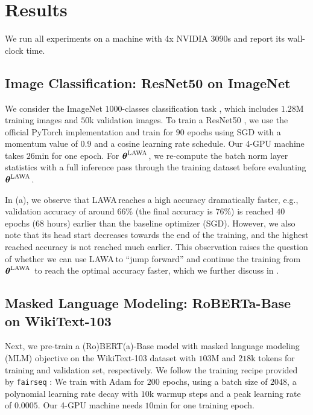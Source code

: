 \documentclass{article}
\newcommand{\apr}{\raisebox{0.5ex}{\texttildelow}}
\newcommand{\params}{\boldsymbol{\theta}}
\newcommand{\method}{LAWA\,}
\newcommand{\lawasol}{\params^{\text{\method}}}
\begin{document}
\section{Results}\label{sec:results}

We run all experiments on a machine with 4x NVIDIA 3090s and report its wall-clock time.

\subsection{Image Classification: ResNet50 on ImageNet}

We consider the ImageNet $1000$-classes classification task \cite{imagenet}, which includes $1.28$M training images and $50$k validation images. To train a ResNet50 \cite{resnet}, we use the official PyTorch implementation \cite{pytorch} and train for $90$ epochs using SGD with a momentum value of $0.9$ and a cosine learning rate schedule. Our 4-GPU machine takes \apr$26$min for one epoch. For $\lawasol$, we re-compute the batch norm layer statistics with a full inference pass through the training dataset before evaluating $\lawasol$. 

In (a), we observe that \method reaches a high accuracy dramatically faster, e.g., validation accuracy of around \apr$66$\% (the final accuracy is \apr$76$\%) is reached \apr$40$ epochs (\apr $68$ hours) earlier than the baseline optimizer (SGD). However, we also note that its head start decreases towards the end of the training, and the highest reached accuracy is not reached much earlier. This observation raises the question of whether we can use \method to ``jump forward'' and continue the training from $\lawasol$ to reach the optimal accuracy faster, which we further discuss in . 


\subsection{Masked Language Modeling: RoBERTa-Base on WikiText-103}
\label{exp:BERT}

Next, we pre-train a (Ro)BERT(a)-Base \cite{devlin2018bert,roberta} model with masked language modeling (MLM) objective on the WikiText-103 dataset \cite{wikitext} with $103$M and $218$k tokens for training and validation set, respectively. We follow the training recipe provided by \texttt{fairseq} \cite{ott2019fairseq}: We train with Adam \cite{adam} for $200$ epochs, using a batch size of $2048$, a polynomial learning rate decay with $10$k warmup steps and a peak learning rate of $0.0005$. Our 4-GPU machine needs \apr$10$min for one training epoch.  
\end{document}
